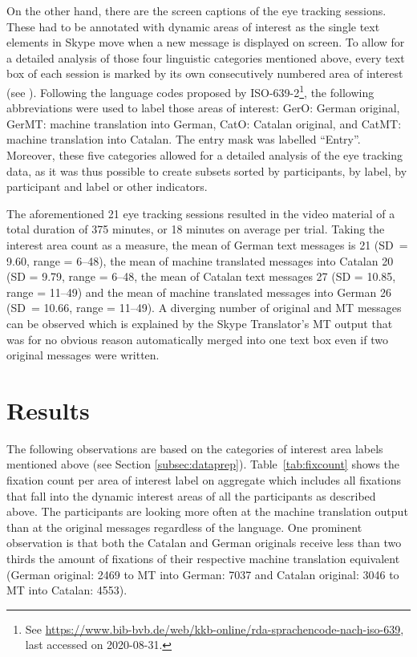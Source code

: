 \documentclass[output=paper]{langscibook}
\begin{document}
On the other hand, there are the screen captions of the eye tracking sessions. These had to be annotated with dynamic areas of interest as the single text elements in Skype move when a new message is displayed on screen. To allow for a detailed analysis of those four linguistic categories mentioned above, every text box of each session is marked by its own consecutively numbered area of interest (see ). Following the language codes proposed by ISO-639-2\footnote{See \url{https://www.bib-bvb.de/web/kkb-online/rda-sprachencode-nach-iso-639}, last accessed on 2020-08-31.}, the following abbreviations were used to label those areas of interest: GerO: German original, GerMT: machine translation into German, CatO: Catalan original, and CatMT: machine translation into Catalan. The entry mask was labelled ``Entry''. Moreover, these five categories allowed for a detailed analysis of the eye tracking data, as it was thus possible to create subsets sorted by participants, by label, by participant and label or other indicators.

The aforementioned 21 eye tracking sessions resulted in the video material of a total duration of 375 minutes, or 18 minutes on average per trial. Taking the interest area count as a measure, the mean of German text messages is 21 (SD~= 9.60, range = 6--48), the mean of machine translated messages into Catalan 20 (SD = 9.79, range = 6--48, the mean of Catalan text messages 27 (SD = 10.85, range = 11--49) and the mean of machine translated messages into German 26 (SD~= 10.66, range = 11--49). A diverging number of original and MT messages can be observed which is explained by the Skype Translator's MT output that was for no obvious reason automatically merged into one text box even if two original messages were written.




\section{Results}
\label{sec:Results}


The following observations are based on the categories of interest area labels mentioned above (see Section \ref{subsec:dataprep}). Table~\ref{tab:fixcount} shows the fixation count per area of interest label on aggregate which includes all fixations that fall into the dynamic interest areas of all the participants as described above. The participants are looking more often at the machine translation output than at the original messages regardless of the language. One prominent observation is that both the Catalan and German originals receive less than two thirds the amount of fixations of their respective machine translation equivalent (German original: 2469 to MT into German: 7037 and Catalan original: 3046 to MT into Catalan: 4553).  
\end{document}
